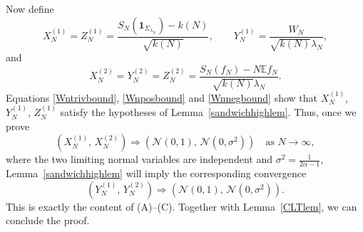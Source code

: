 \documentclass[11pt,twoside,a4paper,reqno]{amsart}
\newcommand{\as}[1]{\text{as } #1 \rightarrow\infty}
\newcommand{\E}{\mathbb{E}}
\def\one{{\mathbf{1}}}
\begin{document}
Now define
\begin{equation*}
X_N^{(1)}=Z_N^{(1)}=\frac{S_N(\one_{\Sigma_{\lambda_N}})-k(N)}{\sqrt{k(N)}},\qquad
Y_N^{(1)}=\frac{W_N}{\sqrt{k(N)}\lambda_N},
\end{equation*}
and
\begin{equation*}
X_N^{(2)}=Y_N^{(2)}=Z_N^{(2)}=\frac{S_N(f_N)-N\E f_N}{\sqrt{k(N)}\lambda_N}.
\end{equation*}
Equations \eqref{Wntrivbound}, \eqref{Wnposbound} and \eqref{Wnnegbound} show that $X_N^{(1)}$, $Y_N^{(1)}$, $Z_N^{(1)}$ satisfy the hypotheses of Lemma~\ref{sandwichhighlem}.
Thus, once we prove
\begin{equation}\label{NmCm}
\left(X_N^{(1)},\,X_N^{(2)}\right)
\Rightarrow\left(\mathcal{N}(0,1),\,\mathcal{N}(0,\sigma^2)\right)
\quad \as{N},
\end{equation}
where the two limiting normal variables are independent and $\sigma^2=\frac{1}{2\alpha-1}$, Lemma~\ref{sandwichhighlem} will imply the corresponding convergence
\begin{equation*}
\left(Y_N^{(1)},\,Y_N^{(2)}\right)
\Rightarrow\left(\mathcal{N}(0,1),\,\mathcal{N}(0,\sigma^2)\right).
\end{equation*}
This is exactly the content of (A)--(C). Together with Lemma~\ref{CLTlem}, we can conclude the proof.
\end{document}
